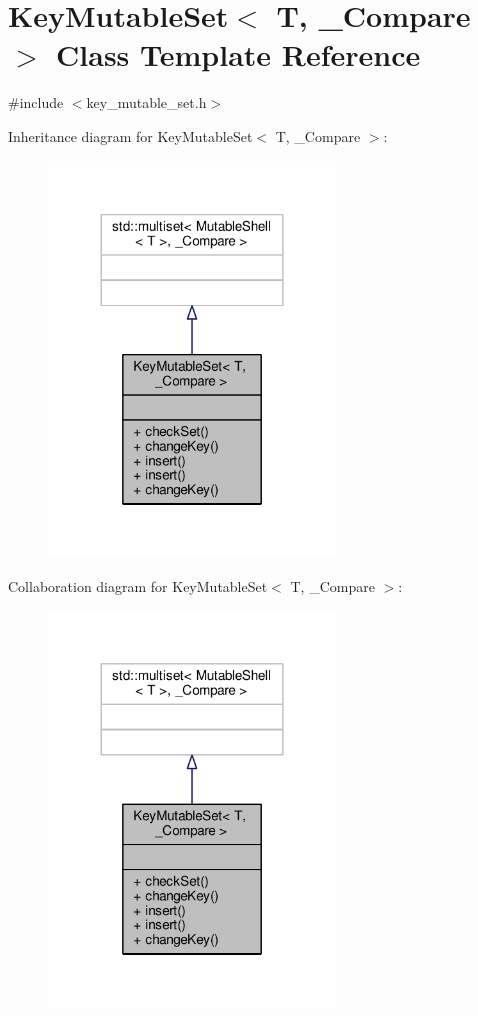 \hypertarget{classKeyMutableSet}{}\section{Key\+Mutable\+Set$<$ T, \+\_\+\+Compare $>$ Class Template Reference}
\label{classKeyMutableSet}


{\ttfamily \#include $<$key\+\_\+mutable\+\_\+set.\+h$>$}



Inheritance diagram for Key\+Mutable\+Set$<$ T, \+\_\+\+Compare $>$\+:
\nopagebreak
\begin{figure}[H]
\begin{center}
\leavevmode
\includegraphics[width=216pt]{d9/d0e/classKeyMutableSet__inherit__graph}
\end{center}
\end{figure}


Collaboration diagram for Key\+Mutable\+Set$<$ T, \+\_\+\+Compare $>$\+:
\nopagebreak
\begin{figure}[H]
\begin{center}
\leavevmode
\includegraphics[width=216pt]{d5/dea/classKeyMutableSet__coll__graph}
\end{center}
\end{figure}
